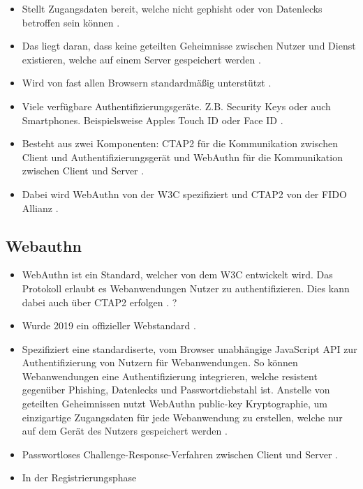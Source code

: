 \begin{itemize}
    \item Stellt Zugangsdaten bereit, welche nicht gephisht oder von Datenlecks betroffen sein können \cite{lyastani2020fido2}.
    \item Das liegt daran, dass keine geteilten Geheimnisse zwischen Nutzer und Dienst existieren, welche auf einem Server gespeichert werden \cite{morii2017research}.
    \item Wird von fast allen Browsern standardmäßig unterstützt \cite{lyastani2020fido2}.
    \item Viele verfügbare Authentifizierungsgeräte. Z.B. Security Keys oder auch Smartphones. Beispielsweise Apples Touch ID oder Face ID \cite{lyastani2020fido2}.
    \item Besteht aus zwei Komponenten: CTAP2 für die Kommunikation zwischen Client und Authentifizierungsgerät und WebAuthn für die Kommunikation zwischen Client und Server \cite{farke2020you}.
    \item Dabei wird WebAuthn von der \ac{W3C} spezifiziert und CTAP2 von der \ac{FIDO} Allianz \cite{farke2020you}.
\end{itemize}

\subsection{Webauthn}

\begin{itemize}
    \item WebAuthn ist ein Standard, welcher von dem \ac{W3C} entwickelt wird. Das Protokoll erlaubt es Webanwendungen Nutzer zu authentifizieren. Dies kann dabei auch über \ac{CTAP2} erfolgen \cite{lyastani2020fido2}. ?
    \item Wurde 2019 ein offizieller Webstandard \cite{farke2020you}.
    \item Spezifiziert eine standardiserte, vom Browser unabhängige JavaScript API zur Authentifizierung von Nutzern für Webanwendungen. So können Webanwendungen eine Authentifizierung integrieren, welche resistent gegenüber Phishing, Datenlecks und Passwortdiebstahl ist. Anstelle von geteilten Geheimnissen nutzt WebAuthn public-key Kryptographie, um einzigartige Zugangsdaten für jede Webanwendung zu erstellen, welche nur auf dem Gerät des Nutzers gespeichert werden \cite{farke2020you}.
    \item Passwortloses Challenge-Response-Verfahren zwischen Client und Server \cite{barbosa2021provable}.
    \item In der Registrierungsphase 
\end{itemize}


